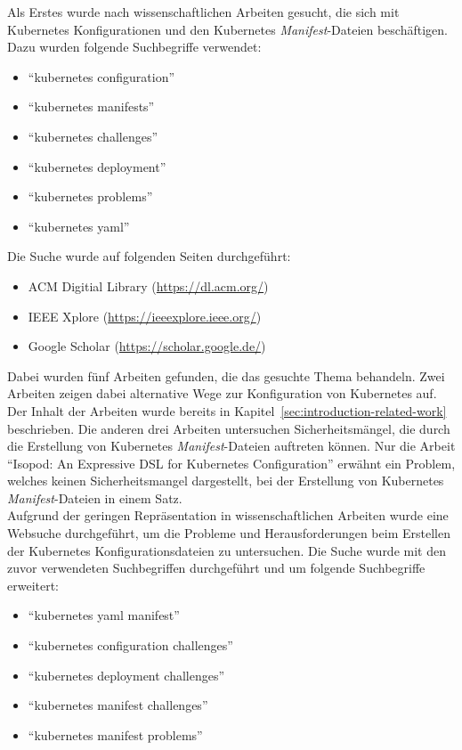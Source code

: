 Als Erstes wurde nach wissenschaftlichen Arbeiten gesucht, die sich mit Kubernetes Konfigurationen und den Kubernetes \textit{Manifest}-Dateien
beschäftigen. Dazu wurden folgende Suchbegriffe verwendet:
\begin{itemize}
  \setlength\itemsep{-0.5cm}
  \item ``kubernetes configuration''
  \item ``kubernetes manifests''
  \item ``kubernetes challenges''
  \item ``kubernetes deployment''
  \item ``kubernetes problems''
  \item ``kubernetes yaml''
\end{itemize}
Die Suche wurde auf folgenden Seiten durchgeführt:
\begin{itemize}
  \setlength\itemsep{-0.5cm}
  \item ACM Digitial Library (\url{https://dl.acm.org/})
  \item IEEE Xplore (\url{https://ieeexplore.ieee.org/})
  \item Google Scholar (\url{https://scholar.google.de/})
\end{itemize}
Dabei wurden fünf Arbeiten gefunden, die das gesuchte Thema behandeln. Zwei Arbeiten zeigen dabei alternative Wege zur Konfiguration von Kubernetes auf.
Der Inhalt der Arbeiten wurde bereits in Kapitel~\ref{sec:introduction-related-work} beschrieben. Die anderen drei Arbeiten untersuchen Sicherheitsmängel,
die durch die Erstellung von Kubernetes \textit{Manifest}-Dateien auftreten können.
Nur die Arbeit ``Isopod: An Expressive DSL for Kubernetes Configuration'' erwähnt ein Problem, welches keinen Sicherheitsmangel dargestellt, bei der Erstellung von Kubernetes \textit{Manifest}-Dateien
in einem Satz.
\\
Aufgrund der geringen Repräsentation in wissenschaftlichen Arbeiten wurde eine Websuche durchgeführt, um die Probleme und Herausforderungen beim Erstellen
der Kubernetes Konfigurationsdateien zu untersuchen.
Die Suche wurde mit den zuvor verwendeten Suchbegriffen durchgeführt und um folgende Suchbegriffe erweitert:
\begin{itemize}
  \setlength\itemsep{-0.5cm}
  \item ``kubernetes yaml manifest''
  \item ``kubernetes configuration challenges''
  \item ``kubernetes deployment challenges''
  \item ``kubernetes manifest challenges''
  \item ``kubernetes manifest problems''
\end{itemize}
